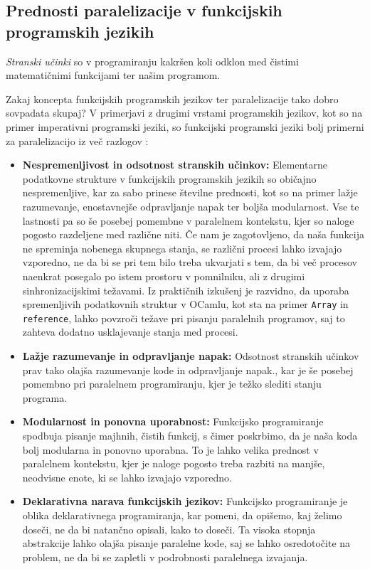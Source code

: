 \documentclass[mat1, tisk]{fmfdelo}
\begin{document}
\subsection{Prednosti paralelizacije v funkcijskih programskih jezikih}

\emph{Stranski učinki} so v programiranju kakršen koli odklon med čistimi matematičnimi funkcijami ter našim programom.

Zakaj koncepta funkcijskih programskih jezikov ter paralelizacije tako dobro sovpadata skupaj?
V primerjavi z drugimi vrstami programskih jezikov, kot so na primer imperativni programski jeziki,
so funkcijski programski jeziki bolj primerni za paralelizacijo iz več razlogov 
\cite{linke_fundamental_2015, functional_parallel_graph_rewriting}:

\begin{itemize} \label{itemize:prednosti_funkcijskega_programiranja}
  \item \textbf{Nespremenljivost in odsotnost stranskih učinkov:} 
    Elementarne podatkovne strukture v funkcijskih programskih jezikih so običajno nespremenljive, kar za sabo prinese številne
    prednosti, kot so na primer lažje razumevanje, enostavnejše odpravljanje napak ter boljša modularnost.
    Vse te lastnosti pa so še posebej pomembne v paralelnem kontekstu, kjer so naloge pogosto razdeljene med
    različne niti. Če nam je zagotovljeno, da naša funkcija ne spreminja nobenega skupnega stanja, se
    različni procesi lahko izvajajo vzporedno, ne da bi se pri tem bilo treba ukvarjati s tem, da bi več procesov
    naenkrat posegalo po istem prostoru v pomnilniku, ali z drugimi sinhronizacijskimi težavami.
    Iz praktičnih izkušenj je razvidno, da uporaba spremenljivih podatkovnih struktur v OCamlu, kot sta na primer
    \texttt{Array} in \texttt{reference}, lahko povzroči težave pri pisanju paralelnih programov, saj to zahteva
    dodatno usklajevanje stanja med procesi.

  \item \textbf{Lažje razumevanje in odpravljanje napak:} 
    Odsotnost stranskih učinkov prav tako olajša razumevanje kode in odpravljanje napak., kar je še posebej
    pomembno pri paralelnem programiranju, kjer je težko slediti stanju programa.

  \item \textbf{Modularnost in ponovna uporabnost:}
    Funkcijsko programiranje spodbuja pisanje majhnih, čistih funkcij, s čimer poskrbimo, da je naša koda bolj 
    modularna in ponovno uporabna. To je lahko velika prednost v paralelnem kontekstu,
    kjer je naloge pogosto treba razbiti na manjše, neodvisne enote, ki se lahko izvajajo vzporedno.

  \item \textbf{Deklarativna narava funkcijskih jezikov:} 
    Funkcijsko programiranje je oblika deklarativnega programiranja, kar pomeni, da opišemo, kaj želimo doseči, 
    ne da bi natančno opisali, kako to doseči. Ta visoka stopnja abstrakcije lahko olajša pisanje paralelne kode, 
    saj se lahko osredotočite na problem, ne da bi se zapletli v podrobnosti paralelnega izvajanja.
\end{itemize}
\end{document}
